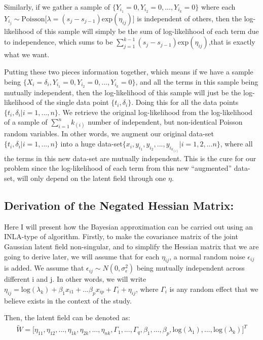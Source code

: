\documentclass[]{article}
\begin{document}
Similarly, if we gather a sample of
\(\{Y_{i_{1}}=0,Y_{i_{2}} =0, ..., Y_{i_{k}}=0 \}\) where each
\(Y_{i_j} \sim \text{Poisson}\big[\lambda = (s_{j}-s_{j-1})\text{exp}(\eta_{ij})\big]\)
is independent of others, then the log-likelihood of this sample will
simply be the sum of log-likelihood of each term due to independence,
which sums to be
\(\sum_{j=1}^{k-1} (s_{j}-s_{j-1})\text{exp}(\eta_{ij})\),that is
exactly what we want.

Putting these two pieces information together, which means if we have a
sample being
\(\{X_i =\delta_i,Y_{i_{1}}=0,Y_{i_{2}} =0, ..., Y_{i_{k}}=0 \}\), and
all the terms in this sample being mutually independent, then the
log-likelihood of this sample will just be the log-likelihood of the
single data point \(\{t_i,\delta_i\}\). Doing this for all the data
points \(\{t_i,\delta_i|i=1,...,n\}\). We retrieve the original
log-likelihood from the log-likelihood of a sample of
\(\sum_{i=1}^{n}{k_{(i)}}\) number of independent, but non-identical
Poisson random variables. In other words, we augment our original
data-set \(\{t_i,\delta_i|i=1,...,n\}\) into a huge
data-set\(\{x_i ,y_{i_{1}},y_{i_{2}}, ..., y_{i_{k_{(i)}}}|i=1,2,...n\}\),
where all the terms in this new data-set are mutually independent. This
is the cure for our problem since the log-likelihood of each term from
this new ``augmented'' data-set, will only depend on the latent field
through one \(\eta\).

\hypertarget{derivation-of-the-negated-hessian-matrix}{%
\subsection{Derivation of the Negated Hessian
Matrix:}\label{derivation-of-the-negated-hessian-matrix}}

Here I will present how the Bayesian approximation can be carried out
using an INLA-type of algorithm. Firstly, to make the covariance matrix
of the joint Gaussian latent field non-singular, and to simplify the
Hessian matrix that we are going to derive later, we will assume that
for each \(\eta_{ij}\), a normal random noise \(\epsilon_{ij}\) is
added. We assume that \(\epsilon_{ij} \sim N(0,\sigma^2_{\epsilon})\)
being mutually independent across different i and j. In other words, we
will write
\(\eta_{ij} = \text{log}(\lambda_k)+\beta_1x_{i1}+...\beta_px_{ip} + \Gamma_i+\eta_{ij}\),
where \(\Gamma_i\) is any random effect that we believe exists in the
context of the study.

Then, the latent field can be denoted as:
\begin{equation}\begin{aligned}\label{eqn:field1}
\tilde W = \big[\eta_{11},\eta_{12},...,\eta_{1k},\eta_{2k},...,\eta_{nk},\Gamma_1,...,\Gamma_q,\beta_1,...,\beta_p,\text{log}(\lambda_1),...,\text{log}(\lambda_k)\big]^T\\
\end{aligned}\end{equation}
\end{document}
